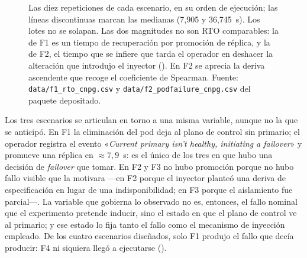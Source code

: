\begin{figure}[tb]
\centering
{}
\caption{Las diez repeticiones de cada escenario, en su orden de ejecución; las líneas
discontinuas marcan las medianas (7,905 y 36,745~s). Los lotes no se solapan. Las dos magnitudes no
son RTO comparables: la de F1 es un tiempo de recuperación por promoción de réplica, y la de F2,
el tiempo que se infiere que tarda el operador en deshacer la alteración que introdujo el inyector
(). En F2 se aprecia la deriva ascendente que recoge el coeficiente de
Spearman. Fuente: \texttt{data/f1\_rto\_cnpg.csv} y
\texttt{data/f2\_podfailure\_\allowbreak cnpg.csv} del paquete depositado.}
\label{fig:timeline}
\end{figure}

Los tres escenarios se articulan en torno a una misma variable, aunque no la que se anticipó. En F1 la eliminación del pod deja al plano de control sin primario; el operador registra el evento «\textit{Current primary isn't healthy, initiating a failover}» y promueve una réplica en $\approx 7{,}9$~s: es el único de los tres en que hubo una decisión de \textit{failover} que tomar. En F2 y F3 no hubo promoción porque no hubo fallo visible que la motivara —en F2 porque el inyector planteó una deriva de especificación en lugar de una indisponibilidad; en F3 porque el aislamiento fue parcial—. La variable que gobierna lo observado no es, entonces, el fallo nominal que el experimento pretende inducir, sino el estado en que el plano de control ve al primario; y ese estado lo fija tanto el fallo como el mecanismo de inyección empleado. De los cuatro escenarios diseñados, solo F1 produjo el fallo que decía producir: F4 ni siquiera llegó a ejecutarse ().

